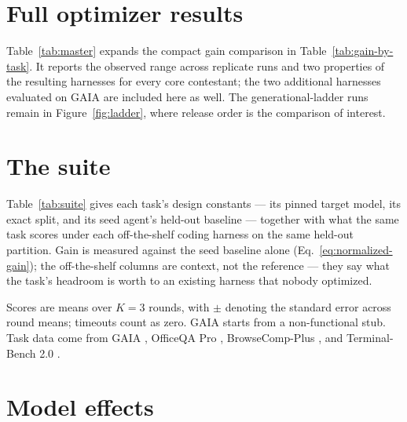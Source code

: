 

\section{Full optimizer results}
\label{app:master}

Table~\ref{tab:master} expands the compact gain comparison in
Table~\ref{tab:gain-by-task}. It reports the observed range across replicate
runs and two properties of the resulting harnesses for every core contestant;
the two additional harnesses evaluated on GAIA are included here as well. The
generational-ladder runs remain in Figure~\ref{fig:ladder}, where release order
is the comparison of interest.



\FloatBarrier

\section{The suite}
\label{app:suite}

Table~\ref{tab:suite} gives each task's design constants --- its pinned target
model, its exact split, and its seed agent's held-out baseline --- together with
what the same task scores under each off-the-shelf coding harness on the same
held-out partition. Gain is measured against the seed baseline alone
(Eq.~\ref{eq:normalized-gain}); the off-the-shelf columns are context, not the
reference --- they say what the task's headroom is worth to an existing harness
that nobody optimized.

Scores are means over $K{=}3$ rounds, with $\pm$ denoting the standard error
across round means; timeouts count as zero. GAIA starts from a
non-functional stub. Task data come from GAIA \citep{mialon2023gaia}, OfficeQA
Pro \citep{opsahlong2026officeqaproenterprisebenchmark}, BrowseComp-Plus
\citep{browsecompplus2025}, and Terminal-Bench 2.0
\citep{merrill2026terminalbenchbenchmarkingagentshard}.



\FloatBarrier

\section{Model effects}
\label{app:model-effects}

